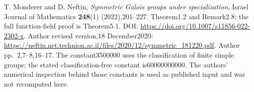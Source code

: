 T. Monderer and D. Neftin,
\emph{Symmetric Galois groups under specialization},
Israel Journal of Mathematics \textbf{248}(1) (2022),201--227.
Theorem1.2 and Remark2.8; the full function-field proof is Theorem5.1.
DOI: \url{https://doi.org/10.1007/s11856-022-2302-x}.
Author revised version,18 December2020:
\url{https://neftin.net.technion.ac.il/files/2020/12/symmetric_181220.pdf}.
Author pp.~2,7--8,16--17. The constant3500000 uses the classification
of finite simple groups; the stated classification-free constant
is60000000000. The authors' numerical inspection behind those
constants is used as published input and was not recomputed here.
